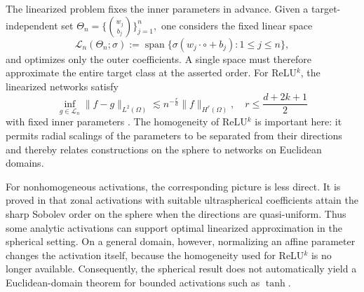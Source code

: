\documentclass{article}
\numberwithin{equation}{section}
\begin{document}
The linearized problem fixes the inner parameters in advance. Given a target-independent set $\displaystyle\Theta_n=\Big\{\binom{w_j}{b_j}\Big\}_{j=1}^n,$ one considers the fixed linear space
\begin{equation}\label{eqn:linearized-network}
    \mathcal L_n(\Theta_n;\sigma)
    :=\operatorname{span}\{\sigma(w_j\cdot\circ+b_j):1\leq j\leq n\},
\end{equation}
and optimizes only the outer coefficients. A single space must therefore approximate the entire target class at the asserted order. For ReLU$^k$, the linearized networks satisfy
\begin{equation}\label{eqn:liu-linearized-rate}
    \inf_{g\in\mathcal L_n}\|f-g\|_{L^2(\Omega)}
    \lesssim
    n^{-\frac rd}
    \|f\|_{H^{r}(\Omega)},\quad r\leq\frac{d+2k+1}{2}
\end{equation}
with fixed inner parameters \cite{liu2025integral}. The homogeneity of ReLU$^k$ is important here: it permits radial scalings of the parameters to be separated from their directions and thereby relates constructions on the sphere to networks on Euclidean domains.

For nonhomogeneous activations, the corresponding picture is less direct. It is proved in \cite{mhaskar1999approximation} that zonal activations with suitable ultraspherical coefficients attain the sharp Sobolev order on the sphere when the directions are quasi-uniform. Thus some analytic activations can support optimal linearized approximation in the spherical setting. On a general domain, however, normalizing an affine parameter changes the activation itself, because the homogeneity used for ReLU$^k$ is no longer available. Consequently, the spherical result does not automatically yield a Euclidean-domain theorem for bounded activations such as $\tanh$.
\end{document}
